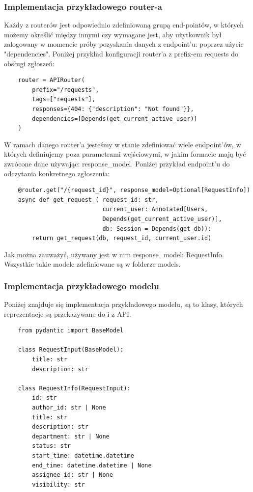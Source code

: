 \subsubsection{Implementacja przykładowego router-a}
Każdy z routerów jest odpowiednio zdefiniowaną grupą end-pointów, w których możemy określić między innymi czy wymagane jest, aby użytkownik był zalogowany w momencie próby pozyskania danych z endpoint'u: poprzez użycie "dependencies". Poniżej przykład konfiguracji router'a z prefix-em requests do obsługi zgłoszeń:
\begin{verbatim}
    router = APIRouter(
        prefix="/requests",
        tags=["requests"],
        responses={404: {"description": "Not found"}},
        dependencies=[Depends(get_current_active_user)]
    )
\end{verbatim}

W ramach danego router'a jesteśmy w stanie zdefiniować wiele endpoint'ów, w których definiujemy poza parametrami wejściowymi, w jakim formacie mają być zwrócone dane używając: response\_model. Poniżej przykład endpoint'u do odczytania konkretnego zgłoszenia: 
\begin{verbatim}
    @router.get("/{request_id}", response_model=Optional[RequestInfo])
    async def get_request_( request_id: str,
                            current_user: Annotated[Users, 
                            Depends(get_current_active_user)],
                            db: Session = Depends(get_db)):
        return get_request(db, request_id, current_user.id)
\end{verbatim}
Jak można zauważyć, używany jest w nim response\_model: RequestInfo. Wszystkie takie modele zdefiniowane są w  folderze models.
\subsubsection{Implementacja przykładowego modelu}
Poniżej znajduje się implementacja przykładowego modelu, są to klasy, których reprezentacje są przekazywane do i z API.
\begin{verbatim}
    from pydantic import BaseModel

    class RequestInput(BaseModel):
        title: str
        description: str
    
    class RequestInfo(RequestInput):
        id: str
        author_id: str | None
        title: str
        description: str
        department: str | None
        status: str
        start_time: datetime.datetime
        end_time: datetime.datetime | None
        assignee_id: str | None
        visibility: str
\end{verbatim}
